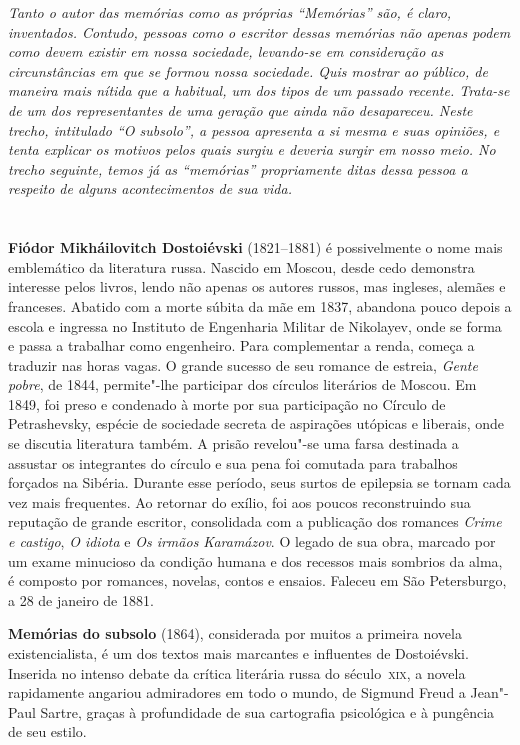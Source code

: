 \textit{Tanto o autor das memórias como as próprias “Memórias” são, é claro,
inventados. Contudo, pessoas como o escritor dessas memórias não apenas podem
como devem existir em nossa sociedade, levando-se em consideração as
circunstâncias em que se formou nossa sociedade. Quis mostrar ao público, de
maneira mais nítida que a habitual, um dos tipos de um passado recente.
Trata-se de um dos representantes de uma geração que ainda não desapareceu.
Neste trecho, intitulado “O subsolo”, a pessoa apresenta a si mesma e suas
opiniões, e tenta explicar os motivos pelos quais surgiu e deveria surgir em
nosso meio. No trecho seguinte, temos já as “memórias” propriamente ditas dessa
pessoa a respeito de alguns acontecimentos de sua vida.}

\chapter{}

\textbf{Fiódor Mikháilovitch Dostoiévski} (1821--1881) é possivelmente o nome mais emblemático da literatura russa. Nascido em Moscou, desde cedo demonstra interesse pelos livros, lendo não apenas os autores russos, mas ingleses, alemães e franceses. Abatido com a morte súbita da mãe em 1837, abandona pouco depois a escola e ingressa no Instituto de Engenharia Militar de Nikolayev, onde se forma e passa a trabalhar como engenheiro. Para complementar a renda, começa a traduzir nas horas vagas. O grande sucesso de seu romance de estreia, \textit{Gente pobre}, de 1844, permite"-lhe participar dos círculos literários de Moscou. Em 1849, foi preso e condenado à morte por sua participação no Círculo de Petrashevsky, espécie de sociedade secreta de aspirações utópicas e liberais, onde se discutia literatura também. A prisão revelou"-se uma farsa destinada a assustar os integrantes do círculo e sua pena foi comutada para trabalhos forçados na Sibéria. Durante esse período, seus surtos de epilepsia se tornam cada vez mais frequentes. Ao retornar do exílio, foi aos poucos reconstruindo sua reputação de grande escritor, consolidada com a publicação dos romances \textit{Crime e castigo}, \textit{O idiota} e \textit{Os irmãos Karamázov}. O legado de sua obra, marcado por um exame minucioso da condição humana e dos recessos mais sombrios da alma, é composto por romances, novelas, contos e ensaios. Faleceu em São Petersburgo, a 28 de janeiro de 1881.

\textbf{Memórias do subsolo} (1864), considerada por muitos a primeira
novela existencialista, é um dos textos mais marcantes e influentes de Dostoiévski. 
Inserida no intenso debate da crítica literária russa do século~\textsc{xix}, a novela 
rapidamente angariou admiradores em todo o mundo, de Sigmund Freud a Jean"-Paul Sartre,
graças à profundidade de sua cartografia psicológica e à pungência de seu estilo.
        
